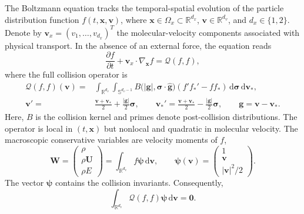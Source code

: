 \documentclass[preprint,3p,12pt]{elsarticle}
\newcommand{\dd}{\,\mathrm{d}}
\newcommand{\vct}[1]{\boldsymbol{#1}}
\newcommand{\R}{\mathbb{R}}
\begin{document}
The Boltzmann equation tracks the temporal-spatial evolution of the particle distribution function $f(t,\vct{x},\vct{v})$, where $\vct{x}\in\Omega_x\subset\R^{d_x}$, $\vct{v}\in\R^{d_v}$, and $d_x\in\{1,2\}$. Denote by $\vct{v}_x=(v_1,\ldots,v_{d_x})^T$ the molecular-velocity components associated with physical transport. In the absence of an external force, the equation reads
\begin{equation}
  \frac{\partial f}{\partial t}
  + \vct{v}_x\cdot\nabla_{\vct{x}} f
  = \mathcal{Q}(f,f),
  \label{eq:boltzmann}
\end{equation}
where the full collision operator is
\begin{align}
  \mathcal{Q}(f,f)(\vct{v})
  ={}& \int_{\R^{d_v}}\int_{\mathbb{S}^{d_v-1}}
  B\bigl(|\vct{g}|,\vct{\sigma}\cdot\widehat{\vct{g}}\bigr)
  \left(f'f_*'-ff_*\right)\dd\vct{\sigma}\dd\vct{v}_*,
  \label{eq:collision-operator}\\
  \vct{v}'={}&\frac{\vct{v}+\vct{v}_*}{2}
  +\frac{|\vct{g}|}{2}\vct{\sigma},
  \qquad
  \vct{v}_*'=\frac{\vct{v}+\vct{v}_*}{2}
  -\frac{|\vct{g}|}{2}\vct{\sigma},
  \qquad
  \vct{g}=\vct{v}-\vct{v}_*.
  \label{eq:post-collision}
\end{align}
Here, $B$ is the collision kernel and primes denote post-collision distributions. The operator is local in $(t,\vct{x})$ but nonlocal and quadratic in molecular velocity. The macroscopic conservative variables are velocity moments of $f$,
\begin{equation}
  \vct{W}
  =
  \begin{pmatrix}
    \rho \\
    \rho\vct{U} \\
    \rho E
  \end{pmatrix}
  = \int_{\R^{d_v}} f\vct{\psi}\dd\vct{v},
  \qquad
  \vct{\psi}(\vct{v})
  =
  \begin{pmatrix}
    1 \\
    \vct{v} \\
    |\vct{v}|^2/2
  \end{pmatrix}.
  \label{eq:moments}
\end{equation}
The vector $\vct{\psi}$ contains the collision invariants. Consequently,
\begin{equation}
  \int_{\R^{d_v}} \mathcal{Q}(f,f)\vct{\psi}\dd\vct{v} = \vct{0}.
  \label{eq:compatibility}
\end{equation}
\end{document}
